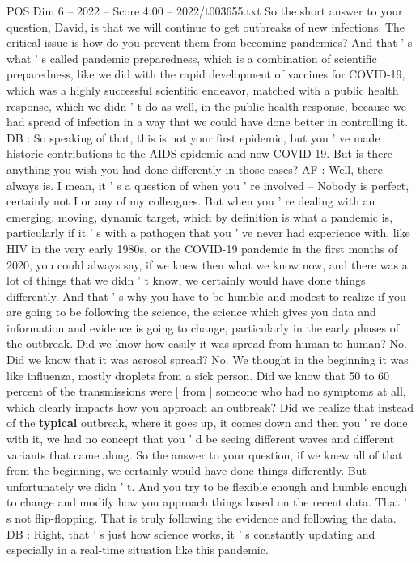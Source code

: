 \begin{textsample}{POS Dim 6 – 2022 – Score 4.00 – 2022/t003655.txt}
So the short answer to your question, David, is that we will continue to get outbreaks of new infections.
The critical issue is how do you prevent them from becoming pandemics?
And that ' s what ' s called pandemic preparedness, which is a combination of scientific preparedness, like we did with the rapid development of vaccines for COVID-19, which was a highly successful scientific endeavor, matched with a public health response, which we didn ' t do as well, in the public health response, because we had spread of infection in a way that we could have done better in controlling it.
DB : So speaking of that, this is not your first epidemic, but you ' ve made historic contributions to the AIDS epidemic and now COVID-19.
But is there anything you wish you had done differently in those cases?
AF : Well, there always is.
I mean, it ' s a question of when you ' re involved -- Nobody is perfect, certainly not I or any of my colleagues.
But when you ' re dealing with an emerging, moving, dynamic target, which by definition is what a pandemic is, particularly if it ' s with a pathogen that you ' ve never had experience with, like HIV in the very early 1980s, or the COVID-19 pandemic in the first months of 2020, you could always say, if we knew then what we know now, and there was a lot of things that we didn ' t know, we certainly would have done things differently.
And that ' s why you have to be humble and modest to realize if you are going to be following the science, the science which gives you data and information and evidence is going to change, particularly in the early phases of the outbreak.
Did we know how easily it was spread from human to human?
No.
Did we know that it was aerosol spread?
No.
We thought in the beginning it was like influenza, mostly droplets from a sick person.
Did we know that 50 to 60 percent of the transmissions were [ from ] someone who had no symptoms at all, which clearly impacts how you approach an outbreak?
Did we realize that instead of the \textbf{typical} outbreak, where it goes up, it comes down and then you ' re done with it, we had no concept that you ' d be seeing different waves and different variants that came along.
So the answer to your question, if we knew all of that from the beginning, we certainly would have done things differently.
But unfortunately we didn ' t.
And you try to be flexible enough and humble enough to change and modify how you approach things based on the recent data.
That ' s not flip-flopping.
That is truly following the evidence and following the data.
DB : Right, that ' s just how science works, it ' s constantly updating and especially in a real-time situation like this pandemic.

\end{textsample}
